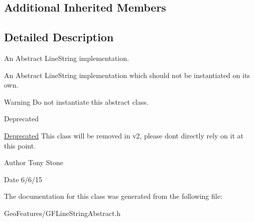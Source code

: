 \subsection*{Additional Inherited Members}


\subsection{Detailed Description}
An Abstract Line\+String implementation. 

An Abstract Line\+String implementation which should not be instantiated on it\textquotesingle{}s own.

\begin{DoxyWarning}{Warning}
Do not instantiate this abstract class.
\end{DoxyWarning}
\begin{DoxyRefDesc}{Deprecated}
\item[\hyperlink{deprecated__deprecated000001}{Deprecated}]This class will be removed in v2, please don\textquotesingle{}t directly rely on it at this point.\end{DoxyRefDesc}


\begin{DoxyAuthor}{Author}
Tony Stone 
\end{DoxyAuthor}
\begin{DoxyDate}{Date}
6/6/15 
\end{DoxyDate}


The documentation for this class was generated from the following file\+:\begin{DoxyCompactItemize}
\item 
Geo\+Features/G\+F\+Line\+String\+Abstract.\+h\end{DoxyCompactItemize}
